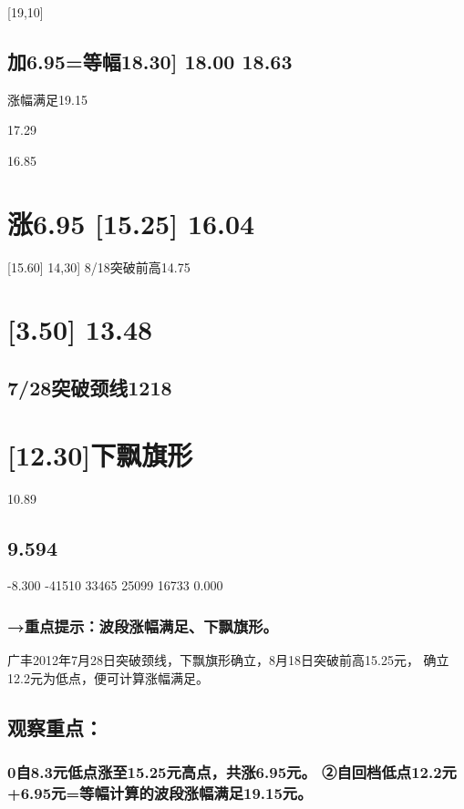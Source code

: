\documentclass{article}
\begin{document}
[19,10]

\subsection{加6.95=等幅18.30] 18.00 18.63}

涨幅满足19.15

17.29

16.85

\section{涨6.95 [15.25] 16.04}

[15.60] 14,30] 8/18突破前高14.75

\section{[3.50] 13.48}

\subsection{7/28突破颈线1218}

\section{[12.30]下飘旗形}

10.89

\subsection{9.594}

-8.300 -41510 33465 25099 16733 0.000

\subsubsection{→重点提示：波段涨幅满足、下飘旗形。}

广丰2012年7月28日突破颈线，下飘旗形确立，8月18日突破前高15.25元， 确立12.2元为低点，便可计算涨幅满足。

\subsection{观察重点：}

\subsubsection{0自8.3元低点涨至15.25元高点，共涨6.95元。 ②自回档低点12.2元+6.95元=等幅计算的波段涨幅满足19.15元。}
\end{document}

